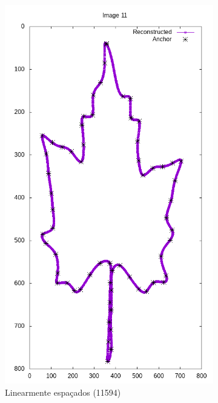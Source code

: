 \begin{frame}
\begin{figure}[ht!]
		\begin{subfigure}[t]{0.24\textwidth}
			\centering
			\includegraphics[width=\textwidth]{img/rec/11lin(11594).png}
			\caption{Linearmente espaçados (11594)}
		\end{subfigure}
		\begin{subfigure}[t]{0.24\textwidth}
			\centering

\end{subfigure}
\end{figure}
\end{frame}
